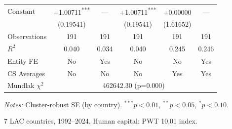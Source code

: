 \begin{table}[htbp]
\begin{tabular}{lccccc}
$\text{Constant}$ & +1.00711\textsuperscript{***} & --- & +1.00711\textsuperscript{***} & +0.00000\textsuperscript{} & --- \\
 & (0.19541) &  & (0.19541) & (1.61652) &  \\[2pt]
\midrule
Observations & 191 & 191 & 191 & 191 & 191 \\
$R^2$ & 0.040 & 0.034 & 0.040 & 0.245 & 0.246 \\
Entity FE & No & Yes & No & No & Yes \\
CS Averages & No & No & No & Yes & Yes \\
\midrule
Mundlak $\chi^2$ & \multicolumn{5}{c}{462642.30 (p=0.000)} \\
\bottomrule
\end{tabular}
\begin{tablenotes}
\footnotesize
\item \textit{Notes:} Cluster-robust SE (by country). $^{***}p<0.01$, $^{**}p<0.05$, $^{*}p<0.10$.
\item 7 LAC countries, 1992--2024. Human capital: PWT 10.01 index.
\end{tablenotes}
\end{table}